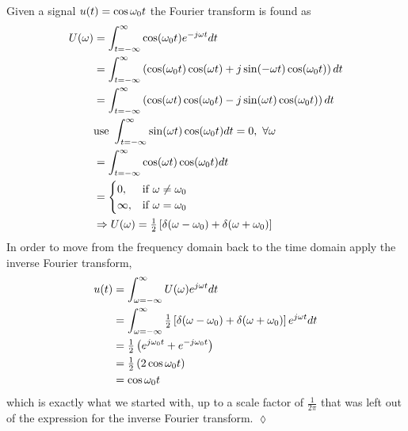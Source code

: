 \begin{example}
Given a signal $u(t)=\cos\omega_0 t$ the Fourier transform is found as
\begin{align*}
U(\omega) &= \int_{t=-\infty}^\infty \cos(\omega_0 t)e^{-j\omega t}dt \\
&= \int_{t=-\infty}^\infty \left(\cos(\omega_0 t)\cos(\omega t) + j\sin(-\omega t)\cos(\omega_0 t)\right)dt \\
&= \int_{t=-\infty}^\infty \left(\cos(\omega t)\cos(\omega_0 t) - j\sin(\omega t)\cos(\omega_0 t)\right)dt \\
&\text{use }\int_{t=-\infty}^\infty \sin(\omega t)\cos(\omega_0 t)dt = 0,~\forall \omega \\
&= \int_{t=-\infty}^\infty \cos(\omega t)\cos(\omega_0 t)dt \\
&= \begin{cases} 0, & \text{if } \omega \neq \omega_0 \\ \infty, & \text{if } \omega = \omega_0 \end{cases} \\
&\Rightarrow U(\omega) = \tfrac{1}{2} \left[\delta(\omega-\omega_0) + \delta(\omega+\omega_0)\right]
\end{align*}
In order to move from the frequency domain back to the time domain apply the inverse Fourier transform,
\begin{align*}
u(t) &= \int_{\omega=-\infty}^\infty U(\omega)e^{j\omega t}dt \\
&= \int_{\omega=-\infty}^\infty \tfrac{1}{2} \left[\delta(\omega-\omega_0) + \delta(\omega+\omega_0)\right] e^{j\omega t}dt \\
&= \tfrac{1}{2}\left(e^{j\omega_0 t} + e^{-j\omega_0 t}\right) \\
&= \tfrac{1}{2}\left(2\cos\omega_0 t\right) \\
&= \cos\omega_0 t
\end{align*}
which is exactly what we started with, up to a scale factor of $\frac{1}{2\pi}$ that was left out of the expression for the inverse Fourier transform.
$\lozenge$
\end{example}

